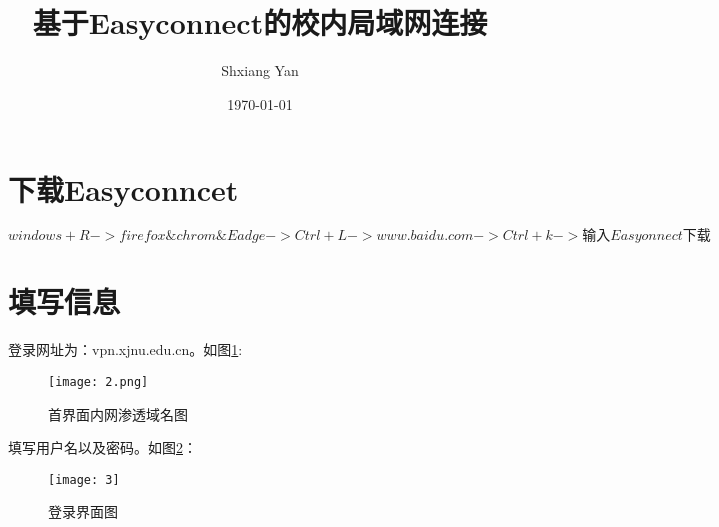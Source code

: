 \documentclass{article}
\title{基于Easyconnect的校内局域网连接}
\author{Shxiang Yan}
\date{\today}
\begin{document}
	\maketitle
	
	\section{下载Easyconncet}
	$windows+R->firefox\&chrom\&Eadge->Ctrl+L->www.baidu.com->Ctrl+k->输入Easyonnect下载$
	
	\section{填写信息}
	登录网址为：vpn.xjnu.edu.cn。如图\ref{key}:
	\begin{figure}[h]
		\centering
		\texttt{[image: 2.png]}
		\caption{首界面内网渗透域名图}\label{key}
	\end{figure}
	
	填写用户名以及密码。如图\ref{key2}：
	\begin{figure}[h]
		\centering
		\texttt{[image: 3]}
		\caption{登录界面图}\label{key2}
	\end{figure}
	
\end{document}

